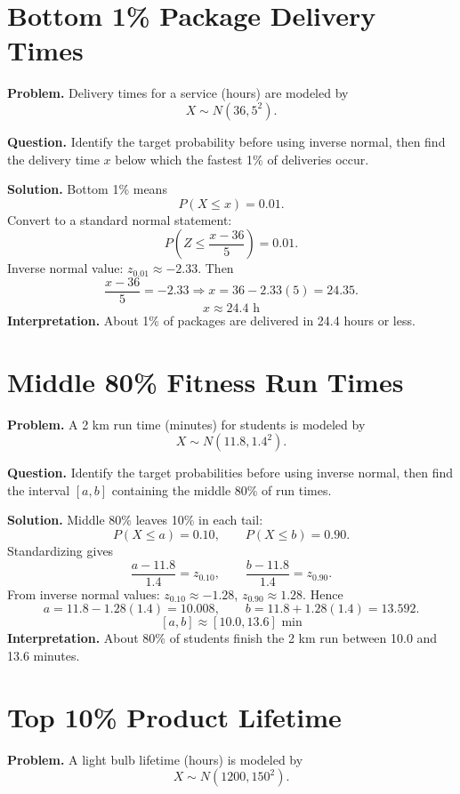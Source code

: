 \section{Bottom 1\% Package Delivery Times}

\textbf{Problem.}
Delivery times for a service (hours) are modeled by
\[
X \sim N(36, 5^2).
\]

\textbf{Question.} Identify the target probability before using inverse normal, then find the delivery time \(x\) below which the fastest 1\% of deliveries occur.

\textbf{Solution.}
Bottom 1\% means
\[
P(X\le x)=0.01.
\]
Convert to a standard normal statement:
\[
P\!\left(Z\le \frac{x-36}{5}\right)=0.01.
\]
Inverse normal value: \(z_{0.01}\approx -2.33\).
Then
\[
\frac{x-36}{5}=-2.33 \Rightarrow x=36-2.33(5)=24.35.
\]
\[
\boxed{x\approx 24.4\text{ h}}
\]
\textbf{Interpretation.} About 1\% of packages are delivered in 24.4 hours or less.

\section{Middle 80\% Fitness Run Times}

\textbf{Problem.}
A 2 km run time (minutes) for students is modeled by
\[
X \sim N(11.8, 1.4^2).
\]

\textbf{Question.} Identify the target probabilities before using inverse normal, then find the interval \([a,b]\) containing the middle 80\% of run times.

\textbf{Solution.}
Middle 80\% leaves 10\% in each tail:
\[
P(X\le a)=0.10,\qquad P(X\le b)=0.90.
\]
Standardizing gives
\[
\frac{a-11.8}{1.4}=z_{0.10},\qquad \frac{b-11.8}{1.4}=z_{0.90}.
\]
From inverse normal values: \(z_{0.10}\approx -1.28\), \(z_{0.90}\approx 1.28\).
Hence
\[
a=11.8-1.28(1.4)=10.008,\qquad b=11.8+1.28(1.4)=13.592.
\]
\[
\boxed{[a,b]\approx[10.0,13.6]\text{ min}}
\]
\textbf{Interpretation.} About 80\% of students finish the 2 km run between 10.0 and 13.6 minutes.

\section{Top 10\% Product Lifetime}

\textbf{Problem.}
A light bulb lifetime (hours) is modeled by
\[
X \sim N(1200, 150^2).
\]

